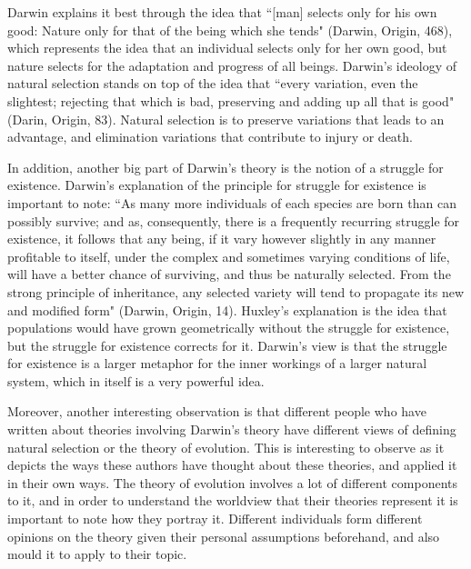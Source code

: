 \documentclass[11pt, oneside]{article}
\begin{document}
\par Darwin explains it best through the idea that ``[man] selects only for his own good: Nature only for that of the being which she tends" (Darwin, Origin, 468), which represents the idea that an individual selects only for her own good, but nature selects for the adaptation and progress of all beings. Darwin's ideology of natural selection stands on top of the idea that ``every variation, even the slightest; rejecting that which is bad, preserving and adding up all that is good" (Darin, Origin, 83). Natural selection is to preserve variations that leads to an advantage, and elimination variations that contribute to injury or death. 

\par In addition, another big part of Darwin's theory is the notion of a struggle for existence. Darwin's explanation of the principle for struggle for existence is important to note: ``As many more individuals of each species are born than can possibly survive; and as, consequently, there is a frequently recurring struggle for existence, it follows that any being, if it vary however slightly in any manner profitable to itself, under the complex and sometimes varying conditions of life, will have a better chance of surviving, and thus be naturally selected. From the strong principle of inheritance, any selected variety will tend to propagate its new and modified form" (Darwin, Origin, 14). Huxley's explanation is the idea that populations would have grown geometrically without the struggle for existence, but the struggle for existence corrects for it. Darwin's view is that the struggle for existence is a larger metaphor for the inner workings of a larger natural system, which in itself is a very powerful idea.


\par Moreover, another interesting observation is that different people who have written about theories involving Darwin's theory have different views of defining natural selection or the theory of evolution. This is interesting to observe as it depicts the ways these authors have thought about these theories, and applied it in their own ways. The theory of evolution involves a lot of different components to it, and in order to understand the worldview that their theories represent it is important to note how they portray it. Different individuals form different opinions on the theory given their personal assumptions beforehand, and also mould it to apply to their topic.
\end{document}
